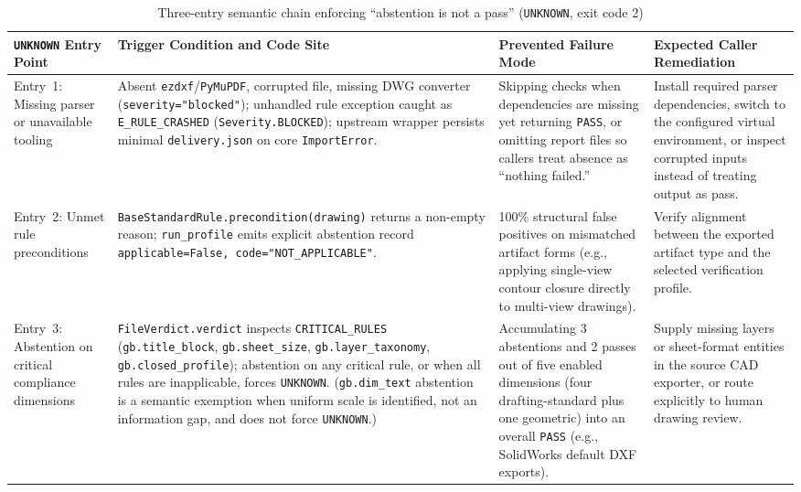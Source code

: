 \documentclass[nocopyright,nolists,upint,varvw,hyphenate]{asmejour}
\begin{document}
\begin{table}[t]
\caption{Three-entry semantic chain enforcing ``abstention is not a pass'' (\texttt{UNKNOWN}, exit code 2)}\label{tab:three_state_chain}
\centering
\footnotesize
{}%
\begin{tabularx}{\textwidth}{L{3.1cm} L{5.4cm} L{4.2cm} Y}
\toprule
\texttt{UNKNOWN} Entry Point & Trigger Condition and Code Site & Prevented Failure Mode & Expected Caller Remediation \\
\midrule
Entry~1: Missing parser or unavailable tooling &
Absent \texttt{ezdxf}/\texttt{PyMuPDF}, corrupted file, missing DWG converter (\texttt{severity="blocked"}); unhandled rule exception caught as \texttt{E\_RULE\_CRASHED} (\texttt{Severity.BLOCKED}); upstream wrapper persists minimal \texttt{delivery.json} on core \texttt{ImportError}. &
Skipping checks when dependencies are missing yet returning \texttt{PASS}, or omitting report files so callers treat absence as ``nothing failed.'' &
Install required parser dependencies, switch to the configured virtual environment, or inspect corrupted inputs instead of treating output as pass. \\
\addlinespace[3pt]
Entry~2: Unmet rule preconditions &
\texttt{BaseStandardRule.precondition(drawing)} returns a non-empty reason; \texttt{run\_profile} emits explicit abstention record \texttt{applicable=False, code="NOT\_APPLICABLE"}. &
100\% structural false positives on mismatched artifact forms (e.g., applying single-view contour closure directly to multi-view drawings). &
Verify alignment between the exported artifact type and the selected verification profile. \\
\addlinespace[3pt]
Entry~3: Abstention on critical compliance dimensions &
\texttt{FileVerdict.verdict} inspects \texttt{CRITICAL\_RULES} (\texttt{gb.title\_block}, \texttt{gb.sheet\_size}, \texttt{gb.layer\_taxonomy}, \texttt{gb.closed\_profile}); abstention on any critical rule, or when all rules are inapplicable, forces \texttt{UNKNOWN}. (\texttt{gb.dim\_text} abstention is a semantic exemption when uniform scale is identified, not an information gap, and does not force \texttt{UNKNOWN}.) &
Accumulating 3 abstentions and 2 passes out of five enabled dimensions (four drafting-standard plus one geometric) into an overall \texttt{PASS} (e.g., SolidWorks default DXF exports). &
Supply missing layers or sheet-format entities in the source CAD exporter, or route explicitly to human drawing review. \\
\bottomrule
\end{tabularx}
\end{table}
\end{document}
